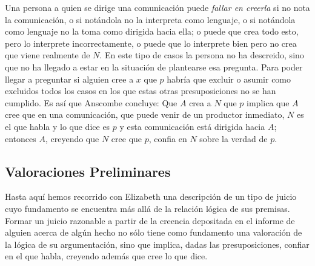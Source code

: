 Una persona a quien se dirige una comunicación puede \emph{fallar en creerla} si
no nota la comunicación, o si notándola no la interpreta como lenguaje, o si
notándola como lenguaje no la toma como dirigida hacia ella; o puede que crea
todo esto, pero lo interprete incorrectamente, o puede que lo interprete bien
pero no crea que viene realmente de $N$. En este tipo de casos la persona no ha
descreido, sino que no ha llegado a estar en la situación de plantearse esa
pregunta. Para poder llegar a preguntar si alguien cree a $x$ que $p$ habría que
excluir o asumir como excluidos todos los casos en los que estas otras
presuposiciones no se han cumplido. Es así que Anscombe concluye:
Que $A$ crea a $N$ que $p$ implica que $A$ cree que en una comunicación, que puede
venir de un productor inmediato, $N$ es el que habla y lo que dice es $p$ y esta
comunicación está dirigida hacia $A$; entonces $A$, creyendo que $N$ cree que
$p$, confia en $N$ sobre la verdad de $p$.

\subsection{Valoraciones Preliminares}
Hasta aquí hemos recorrido con Elizabeth una descripción de un tipo de juicio
cuyo fundamento se encuentra más allá de la relación lógica de sus premisas.
Formar un juicio razonable a partir de la creencia depositada en el informe de
alguien acerca de algún hecho no sólo tiene como fundamento una valoración de la
lógica de su argumentación, sino que implica, dadas las presuposiciones, confiar
en el que habla, creyendo además que cree lo que dice.

